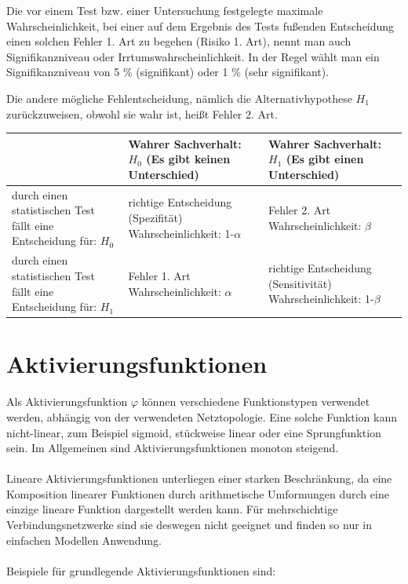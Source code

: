 Die vor einem Test bzw. einer Untersuchung festgelegte maximale Wahrscheinlichkeit, bei einer auf dem Ergebnis des Tests fußenden Entscheidung einen solchen Fehler 1. Art zu begehen (Risiko 1. Art), nennt man auch Signifikanzniveau oder Irrtumswahrscheinlichkeit. In der Regel wählt man ein Signifikanzniveau von 5 $\%$ (signifikant) oder 1 $\%$ (sehr signifikant).

Die andere mögliche Fehlentscheidung, nämlich die Alternativhypothese ${\displaystyle H_{1}}$ zurückzuweisen, obwohl sie wahr ist, heißt Fehler 2. Art.\\

\begin{table}[h!]
\begin{tabular}[t]{| p{4cm} | p{4cm} | p{4cm} |}
\hline \rule[3ex]{0pt}{5.5ex}  & \textbf{Wahrer Sachverhalt: $H_0$
(Es gibt keinen Unterschied)}  & \textbf{Wahrer Sachverhalt: $H_1$
(Es gibt einen Unterschied)} \\ 
\hline \rule[3ex]{0pt}{5.5ex} durch einen statistischen Test fällt eine Entscheidung für: $H_0$ & richtige Entscheidung (Spezifität)
Wahrscheinlichkeit: 1-$\alpha$ & Fehler 2. Art
Wahrscheinlichkeit: $\beta$ \\ 
\hline \rule[3ex]{0pt}{5.5ex} durch einen statistischen Test fällt eine Entscheidung für: $H_1$ & Fehler 1. Art
Wahrscheinlichkeit: $\alpha$ & richtige Entscheidung (Sensitivität)
Wahrscheinlichkeit: 1-$\beta$ \\ 
\hline 
\end{tabular}
\end{table}

\chapter{Aktivierungsfunktionen}
Als Aktivierungsfunktion ${\displaystyle \varphi }$ können verschiedene Funktionstypen verwendet werden, abhängig von der verwendeten Netztopologie. Eine solche Funktion kann nicht-linear, zum Beispiel sigmoid, stückweise linear oder eine Sprungfunktion sein. Im Allgemeinen sind Aktivierungsfunktionen monoton steigend.\\
\\
Lineare Aktivierungsfunktionen unterliegen einer starken Beschränkung, da eine Komposition linearer Funktionen durch arithmetische Umformungen durch eine einzige lineare Funktion dargestellt werden kann. Für mehrschichtige Verbindungsnetzwerke sind sie deswegen nicht geeignet und finden so nur in einfachen Modellen Anwendung.\\
\\
Beispiele für grundlegende Aktivierungsfunktionen sind:\\
